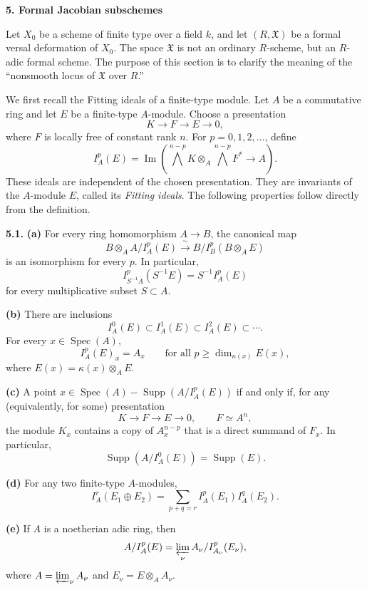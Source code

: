 \bigskip
\noindent\textbf{5. Formal Jacobian subschemes}

\medskip
Let $X_0$ be a scheme of finite type over a field $k$, and let
$(R,\mathfrak X)$ be a formal versal deformation of $X_0$. The space
$\mathfrak X$ is not an ordinary $R$-scheme, but an $R$-adic formal
scheme. The purpose of this section is to clarify the meaning of the
``nonsmooth locus of $\mathfrak X$ over $R$.''

We first recall the Fitting ideals of a finite-type module. Let $A$ be
a commutative ring and let $E$ be a finite-type $A$-module. Choose a
presentation
\[
K\longrightarrow F\longrightarrow E\longrightarrow0,
\]
where $F$ is locally free of constant rank $n$. For
$p=0,1,2,\ldots$, define
\[
I_A^p(E)=\operatorname{Im}\left(
 \bigwedge^{n-p}K\otimes_A\bigwedge^{n-p}F^*
 \longrightarrow A\right).
\]
These ideals are independent of the chosen presentation. They are
invariants of the $A$-module $E$, called its \emph{Fitting ideals}.
The following properties follow directly from the definition.

\medskip
\noindent\textbf{5.1.}
\textbf{(a)} For every ring homomorphism $A\longrightarrow B$, the
canonical map
\[
B\otimes_A A/I_A^p(E)
\xrightarrow{\ \sim\ }
B/I_B^p(B\otimes_AE)
\]
is an isomorphism for every $p$. In particular,
\[
I_{S^{-1}A}^p(S^{-1}E)=S^{-1}I_A^p(E)
\]
for every multiplicative subset $S\subset A$.


\smallskip
\noindent\textbf{(b)} There are inclusions
\[
I_A^0(E)\subset I_A^1(E)\subset I_A^2(E)\subset\cdots.
\]
For every $x\in\operatorname{Spec}(A)$,
\[
I_A^p(E)_x=A_x
\qquad\text{for all }p\geq\dim_{\kappa(x)}E(x),
\]
where $E(x)=\kappa(x)\otimes_AE$.

\smallskip
\noindent\textbf{(c)} A point
$x\in\operatorname{Spec}(A)-\operatorname{Supp}(A/I_A^p(E))$ if and
only if, for any (equivalently, for some) presentation
\[
K\longrightarrow F\longrightarrow E\longrightarrow0,
\qquad F\simeq A^n,
\]
the module $K_x$ contains a copy of $A_x^{n-p}$ that is a direct
summand of $F_x$. In particular,
\[
\operatorname{Supp}(A/I_A^0(E))=\operatorname{Supp}(E).
\]

\smallskip
\noindent\textbf{(d)} For any two finite-type $A$-modules,
\[
I_A^r(E_1\oplus E_2)
=\sum_{p+q=r}I_A^p(E_1)I_A^q(E_2).
\]

\smallskip
\noindent\textbf{(e)} If $A$ is a noetherian adic ring, then
\[
A/I_A^p(E)=\varprojlim_\nu A_\nu/I_{A_\nu}^p(E_\nu),
\]
where $A=\varprojlim_\nu A_\nu$ and $E_\nu=E\otimes_AA_\nu$.

